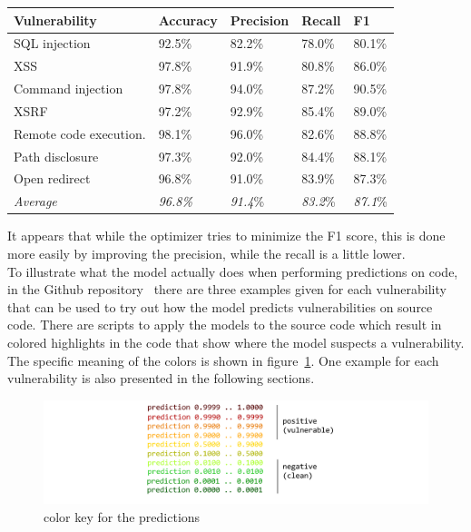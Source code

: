 \documentclass[
a4paper,
pagesize,
pdftex,
12pt,
ngerman,
fleqn,
final,
]{scrartcl}
\begin{document}
	\begin{tabular}{ | p{5cm} || p{2cm}|p{2cm}|p{2cm}|p{2cm}|  }
		\hline
		\textbf{Vulnerability} & \textbf{Accuracy} & \textbf{Precision} & \textbf{Recall} & \textbf{F1} \\
		\hline
		SQL injection & 92.5\% & 82.2\% & 78.0\% & 80.1\%\\
		XSS & 97.8\% & 91.9\% & 80.8\% & 86.0\% \\
		Command injection & 97.8\% & 94.0\% & 87.2\% & 90.5\% \\
		XSRF & 97.2\% & 92.9\% & 85.4\% & 89.0\%\\
		Remote code execution.  & 98.1\% & 96.0\%& 82.6\%& 88.8\%\\
		Path disclosure & 97.3\% & 92.0\% & 84.4\% & 88.1\%\\
		Open redirect & 96.8\% & 91.0\% & 83.9\% & 87.3\% \\
		\hline
		\textit{Average} & \textit{96.8\%} & \textit{91.4}\% & \textit{83.2}\% & \textit{87.1}\%\\
		\hline
		\hline
	\end{tabular}
	
	It appears that while the optimizer tries to minimize the F1 score, this is done more easily by improving the precision, while the recall is a little lower.\\	
	To illustrate what the model actually does when performing predictions on code, in the Github repository~\cite{Wartschinski.2.12.2019} there are three examples given for each vulnerability that can be used to try out how the model predicts vulnerabilities on source code. There are scripts to apply the models to the source code which result in colored highlights in the code that show where the model suspects a vulnerability. The specific meaning of the colors is shown in figure~\ref{fig:legende}. One example for each vulnerability is also presented in the following sections. 
	 \begin{figure}[H]
	 	\centering
	 	\includegraphics[width=0.9\linewidth]{img/colorkeysimple}
	 	\caption{color key for the predictions}
	 	\label{fig:legende}
	 \end{figure}
	 
\end{document}
